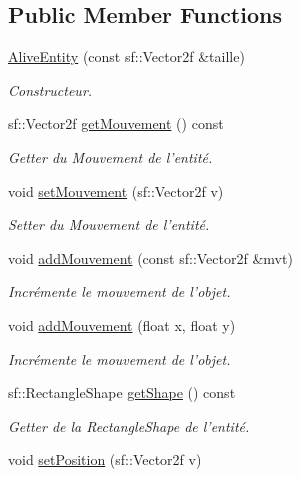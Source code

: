 \subsection*{Public Member Functions}
\begin{DoxyCompactItemize}
\item 
\hyperlink{class_alive_entity_a67bebe6bcef18c0989208060da3b13b2}{Alive\+Entity} (const sf\+::\+Vector2f \&taille)
\begin{DoxyCompactList}\small\item\em Constructeur. \end{DoxyCompactList}\item 
sf\+::\+Vector2f \hyperlink{class_alive_entity_ae90ba96bdca3921e66508753a281fd08}{get\+Mouvement} () const 
\begin{DoxyCompactList}\small\item\em Getter du Mouvement de l'entité. \end{DoxyCompactList}\item 
void \hyperlink{class_alive_entity_af4c6753b36371340afaaae76a5bed7ee}{set\+Mouvement} (sf\+::\+Vector2f v)
\begin{DoxyCompactList}\small\item\em Setter du Mouvement de l'entité. \end{DoxyCompactList}\item 
void \hyperlink{class_alive_entity_aabfbf6895cde97b0ef8d50267ade8970}{add\+Mouvement} (const sf\+::\+Vector2f \&mvt)
\begin{DoxyCompactList}\small\item\em Incrémente le mouvement de l'objet. \end{DoxyCompactList}\item 
void \hyperlink{class_alive_entity_aaca9b5defd187382991876ae32de6779}{add\+Mouvement} (float x, float y)
\begin{DoxyCompactList}\small\item\em Incrémente le mouvement de l'objet. \end{DoxyCompactList}\item 
sf\+::\+Rectangle\+Shape \hyperlink{class_alive_entity_a6f795a340c1842a39bfbe16d3997cd91}{get\+Shape} () const 
\begin{DoxyCompactList}\small\item\em Getter de la Rectangle\+Shape de l'entité. \end{DoxyCompactList}\item 
void \hyperlink{class_alive_entity_a04ae0cdbba3ebcfe08c7dd6eda09dd00}{set\+Position} (sf\+::\+Vector2f v)

\end{DoxyCompactItemize}
